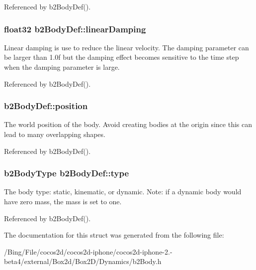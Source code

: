Referenced by b2\-Body\-Def().

\hypertarget{structb2_body_def_a728f6df3be7dedb331455105e3659d46}{
\subsubsection[{linear\-Damping}]{\setlength{\rightskip}{0pt plus 5cm}float32 {\bf b2\-Body\-Def\-::linear\-Damping}}}\label{structb2_body_def_a728f6df3be7dedb331455105e3659d46}
Linear damping is use to reduce the linear velocity. The damping parameter can be larger than 1.\-0f but the damping effect becomes sensitive to the time step when the damping parameter is large. 

Referenced by b2\-Body\-Def().

\hypertarget{structb2_body_def_a680cadc09ad6cf4b3366cbf0914c648b}{
\subsubsection[{position}]{ {\bf b2\-Body\-Def\-::position}}}\label{structb2_body_def_a680cadc09ad6cf4b3366cbf0914c648b}
The world position of the body. Avoid creating bodies at the origin since this can lead to many overlapping shapes. 

Referenced by b2\-Body\-Def().

\hypertarget{structb2_body_def_a89cc3ad1873908042b002147b3861381}{
\subsubsection[{type}]{\setlength{\rightskip}{0pt plus 5cm}b2\-Body\-Type {\bf b2\-Body\-Def\-::type}}}\label{structb2_body_def_a89cc3ad1873908042b002147b3861381}
The body type\-: static, kinematic, or dynamic. Note\-: if a dynamic body would have zero mass, the mass is set to one. 

Referenced by b2\-Body\-Def().



The documentation for this struct was generated from the following file\-:\begin{DoxyCompactItemize}
\item 
/\-Bing/\-File/cocos2d/cocos2d-\/iphone/cocos2d-\/iphone-\/2.-\/beta4/external/\-Box2d/\-Box2\-D/\-Dynamics/b2\-Body.\-h\end{DoxyCompactItemize}
